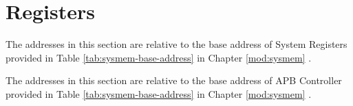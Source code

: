 \documentclass[main\_\_EN.tex]{subfiles}
\begin{document}




\clearpage
\section{Registers}

The addresses in this section are relative to the base address of System Registers provided in Table \ref{tab:sysmem-base-address} in Chapter \ref{mod:sysmem} \textit{}.



The addresses in this section are relative to the base address of APB Controller provided in Table \ref{tab:sysmem-base-address} in Chapter \ref{mod:sysmem} \textit{}.


\end{document}
